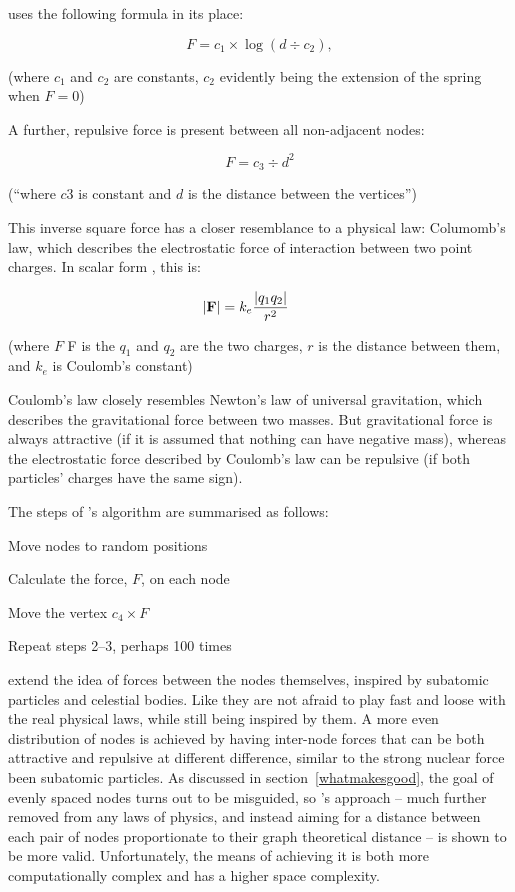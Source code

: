 \citeauthor{eades84} uses the following formula in its place:

$$
F = c_1 \times \log(d \div c_2),
$$

(where $c_1$ and $c_2$ are constants, $c_2$ evidently being the extension of the spring when $F=0$)

A further, repulsive force is present between all non-adjacent nodes:

$$
F = c_3 \div d^2
$$

(``where $c3$ is constant and $d$ is the distance between the vertices'')

This inverse square force has a closer resemblance to a physical law: Columomb's law, which describes the electrostatic force of interaction between two point charges. In scalar form , this is:

$$
|\mathbf F|=k_e{|q_1q_2|\over r^2}\qquad
$$

(where $F$ F is the $q_1$ and $q_2$ are the two charges, $r$ is the distance between them, and $k_e$ is Coulomb's constant)

Coulomb's law closely resembles Newton's law of universal gravitation, which describes the gravitational force between two masses.
But gravitational force is always attractive (if it is assumed that nothing can have negative mass),
whereas the electrostatic force described by Coulomb's law can be repulsive (if both particles' charges have the same sign).

The steps of \citeauthor{eades84}'s algorithm are summarised as follows:

\begin{enumerate*}
\item Move nodes to random positions
\item Calculate the force, $F$, on each node
\item Move the vertex $c_4 \times F$
\item Repeat steps 2--3, perhaps 100 times
\end{enumerate*}

\citet{SPE:SPE4380211102} extend the idea of forces between the nodes themselves, inspired by subatomic particles and celestial bodies. Like \citeauthor{eades84} they are not afraid to play fast and loose with the real physical laws, while still being inspired by them. A more even distribution of nodes is achieved by having inter-node forces that can be both attractive and repulsive at different difference, similar to the strong nuclear force been subatomic particles. As discussed in section~\ref{whatmakesgood}, the goal of evenly spaced nodes turns out to be misguided, so \citet{Kamada19897}'s approach -- much further removed from any laws of physics, and instead aiming for a distance between each pair of nodes proportionate to their graph theoretical distance -- is shown to be more valid. Unfortunately, the means of achieving it is both more computationally complex and has a higher space complexity.

